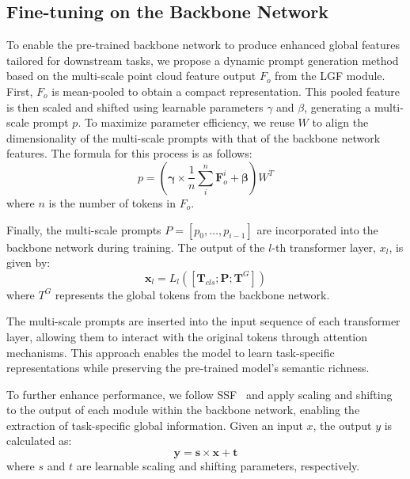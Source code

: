\subsection{Fine-tuning on the Backbone Network}
\label{sec:FT_backbone}
To enable the pre-trained backbone network to produce enhanced global features tailored for downstream tasks, we propose a dynamic prompt generation method based on the multi-scale point cloud feature output $F_{o}$ from the LGF module. First, $F_{o}$ is mean-pooled to obtain a compact representation. This pooled feature is then scaled and shifted using learnable parameters $\gamma$ and $\beta$, generating a multi-scale prompt $p$. To maximize parameter efficiency, we reuse $W$ to align the dimensionality of the multi-scale prompts with that of the backbone network features. The formula for this process is as follows:
\begin{equation}
	p = \left( \boldsymbol{\gamma} \times \frac{1}{n}\sum_i^n{\boldsymbol{F}_{o}^i} + \boldsymbol{\beta} \right) W^T
\end{equation}
where $n$ is the number of tokens in $F_o$.

Finally, the multi-scale prompts $P=[p_{0}, \ldots, p_{i-1}]$ are incorporated into the backbone network during training. The output of the $l$-th transformer layer, $x_l$, is given by:
\begin{equation}
	\boldsymbol{x}_l = L_l\left(\left[\boldsymbol{T}_{cls} ; \boldsymbol{P} ; \boldsymbol{T}^{G}\right]\right)
\end{equation}
where $T^G$ represents the global tokens from the backbone network. 

The multi-scale prompts are inserted into the input sequence of each transformer layer, allowing them to interact with the original tokens through attention mechanisms. This approach enables the model to learn task-specific representations while preserving the pre-trained model's semantic richness.

To further enhance performance, we follow SSF~\cite{lian2022scaling} and apply scaling and shifting to the output of each module within the backbone network, enabling the extraction of task-specific global information. Given an input $x$, the output $y$ is calculated as:
\begin{equation}
	\boldsymbol{y} = \boldsymbol{s} \times \boldsymbol{x} + \boldsymbol{t}
\end{equation}
where $s$ and $t$ are learnable scaling and shifting parameters, respectively.

